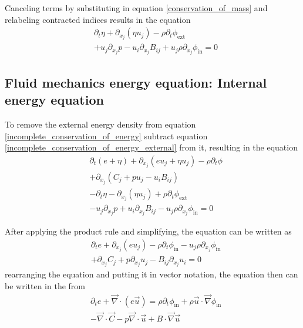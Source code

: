 \documentclass[%
 reprint,
 amsmath,amssymb,
 aps,
]{revtex4-1}
\newcommand{\grad}{\vec{\nabla}}
\begin{document}
Canceling terms by substituting in equation \eqref{conservation_of_mass} and relabeling contracted indices results in the equation
\begin{equation}
\begin{split}
& \partial_t\eta + \partial_{x_j}\left(\eta u_j\right) - \rho\partial_t\phi_{\text{ext}} \\ & + u_j\partial_{x_j}p - u_i\partial_{x_j}B_{ij} + u_j\rho\partial_{x_j}\phi_{\text{in}}=0
\end{split}
\label{incomplete_conservation_of_energy_external}
\end{equation}

\subsection{Fluid mechanics energy equation: Internal energy equation}
To remove the external energy density from equation \eqref{incomplete_conservation_of_energy} subtract equation \eqref{incomplete_conservation_of_energy_external} from it, resulting in the equation
\[
\begin{split}
& \partial_t\left(e + \eta\right) + \partial_{x_j}\left(e u_j + \eta u_j\right) - \rho\partial_t\phi \\ & + \partial_{x_j}\left(C_j + p u_j - u_i B_{ij}\right) \\ & - \partial_t\eta - \partial_{x_j}\left(\eta u_j\right) + \rho\partial_t\phi_{\text{ext}} \\ & - u_j\partial_{x_j}p + u_i\partial_{x_j}B_{ij} - u_j\rho\partial_{x_j}\phi_{\text{in}}=0
\end{split}
\]

After applying the product rule and simplifying, the equation can be written as
\[
\begin{split}
& \partial_te + \partial_{x_j}\left(e u_j\right) - \rho\partial_t\phi_{\text{in}} - u_j\rho\partial_{x_j}\phi_{\text{in}} \\ & + \partial_{x_j}C_j + p\partial_{x_j}u_j - B_{ij}\partial_{x_j}u_i=0
\end{split}
\]
rearranging the equation and putting it in vector notation, the equation then can be written in the from
\begin{equation}
\begin{split}
& \partial_te + \grad\cdot\left(e \vec{u}\right) = \rho\partial_t\phi_{\text{in}} + \rho\vec{u}\cdot\grad\phi_{\text{in}} \\ & - \grad\cdot\vec{C} - p\grad\cdot\vec{u} + B\cdot\grad\vec{u}
\end{split}
\label{conservation_of_energy}
\end{equation}
\end{document}
